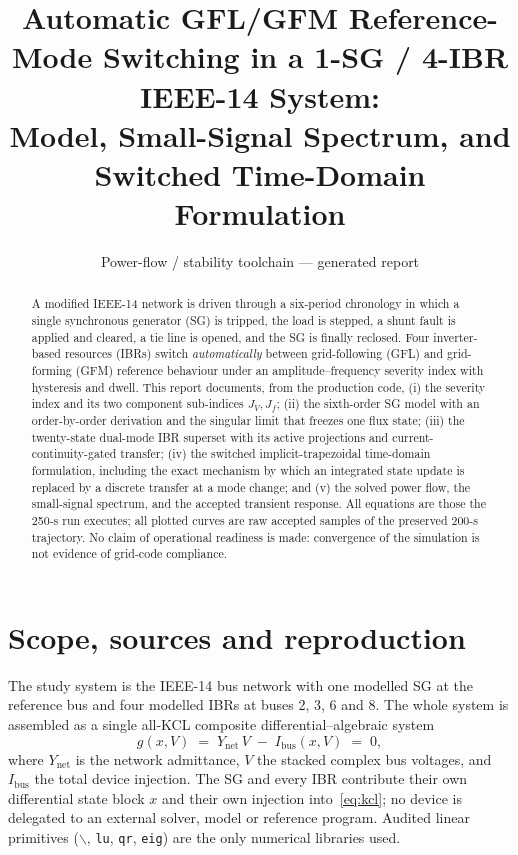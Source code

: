 \documentclass[12pt,a4paper]{article}
\title{\bfseries Automatic GFL/GFM Reference-Mode Switching in a
1-SG / 4-IBR IEEE-14 System:\\[2pt]
\large Model, Small-Signal Spectrum, and Switched Time-Domain Formulation}
\author{Power-flow / stability toolchain --- generated report}
\date{}
\begin{document}
\maketitle
\thispagestyle{fancy}

\begin{abstract}
\noindent
A modified IEEE-14 network is driven through a six-period chronology in which a
single synchronous generator (SG) is tripped, the load is stepped, a shunt fault
is applied and cleared, a tie line is opened, and the SG is finally reclosed.
Four inverter-based resources (IBRs) switch \emph{automatically} between
grid-following (GFL) and grid-forming (GFM) reference behaviour under an
amplitude--frequency severity index with hysteresis and dwell. This report
documents, from the production code, (i) the severity index and its two
component sub-indices $J_V,J_f$; (ii) the sixth-order SG model with an
order-by-order derivation and the singular limit that freezes one flux state;
(iii) the twenty-state dual-mode IBR superset with its active projections and
current-continuity-gated transfer; (iv) the switched implicit-trapezoidal
time-domain formulation, including the exact mechanism by which an integrated
state update is replaced by a discrete transfer at a mode change; and (v) the
solved power flow, the small-signal spectrum, and the accepted transient
response. All equations are those the 250-s run executes; all plotted curves are
raw accepted samples of the preserved 200-s trajectory. No claim of operational
readiness is made: convergence of the simulation is not evidence of
grid-code compliance.
\end{abstract}

\section{Scope, sources and reproduction}\label{sec:scope}
The study system is the IEEE-14 bus network with one modelled SG at the
reference bus and four modelled IBRs at buses 2, 3, 6 and 8. The whole system is
assembled as a single all-KCL composite differential--algebraic system
\begin{equation}
  g(x,V)\;=\;Y_{\mathrm{net}}\,V \;-\; I_{\mathrm{bus}}(x,V)\;=\;0,
  \label{eq:kcl}
\end{equation}
where $Y_{\mathrm{net}}$ is the network admittance, $V$ the stacked complex bus
voltages, and $I_{\mathrm{bus}}$ the total device injection. The SG and every
IBR contribute their own differential state block $x$ and their own injection
into~\eqref{eq:kcl}; no device is delegated to an external solver, model or
reference program. Audited linear primitives ($\backslash$, \texttt{lu},
\texttt{qr}, \texttt{eig}) are the only numerical libraries used.
\end{document}
